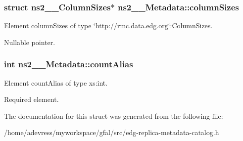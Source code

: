 \subsubsection{\setlength{\rightskip}{0pt plus 5cm}struct \bf{ns2\_\-\_\-Column\-Sizes}$\ast$ \bf{ns2\_\-\_\-Metadata::column\-Sizes}}\label{structns2____Metadata_de394d8161c595d9c7e0c546059a39e9}


Element column\-Sizes of type \char`\"{}http://rmc.data.edg.org\char`\"{}:Column\-Sizes. 

Nullable pointer. 
\subsubsection{\setlength{\rightskip}{0pt plus 5cm}int \bf{ns2\_\-\_\-Metadata::count\-Alias}}\label{structns2____Metadata_1e5052c3dba0c266680ab5e9977e2f6b}


Element count\-Alias of type xs:int. 

Required element. 

The documentation for this struct was generated from the following file:\begin{CompactItemize}
\item 
/home/adevress/myworkspace/gfal/src/edg-replica-metadata-catalog.h\end{CompactItemize}
